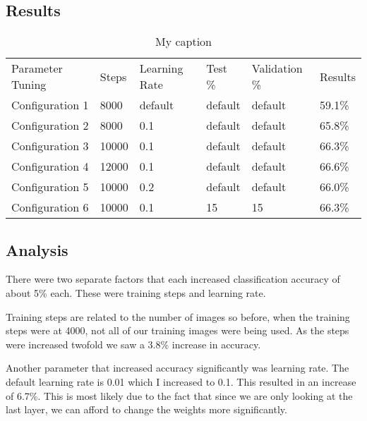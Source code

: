 \subsection*{Results}
\begin{table}[]
	\centering
	\caption{My caption}
	\label{my-label}
	\begin{tabular}{llllll}
		Parameter Tuning & Steps & Learning Rate & Test \% & Validation \% &
		Results \\
		Configuration 1  & 8000  & default       & default & default       &
		59.1\%  \\
		Configuration 2  & 8000  & 0.1           & default & default       &
		65.8\%  \\
		Configuration 3  & 10000 & 0.1           & default & default       &
		66.3\%  \\
		Configuration 4  & 12000 & 0.1           & default & default       &
		66.6\%  \\
		Configuration 5  & 10000 & 0.2           & default & default       &
		66.0\%  \\
		Configuration 6  & 10000 & 0.1           & 15      & 15            &
		66.3\% 
	\end{tabular}
\end{table}

\subsection*{Analysis}
There were two separate factors that each increased classification accuracy of
about 5\% each. These were training steps and learning rate.

Training steps are related to the number of images so before, when the training
steps were at 4000, not all of our training images were being used. As the steps were increased
twofold we saw a 3.8\% increase in accuracy.

Another parameter that increased accuracy significantly was learning rate. The
default learning rate is 0.01 which I increased to 0.1. This resulted in an
increase of 6.7\%. This is most likely due to the fact that since we are only
looking at the last layer, we can afford to change the weights more
significantly.
